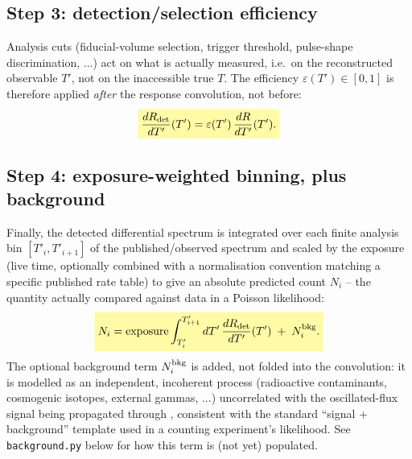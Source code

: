\begin{theorybox}
\subsection*{Step 3: detection/selection efficiency}
Analysis cuts (fiducial-volume selection, trigger threshold,
pulse-shape discrimination, ...) act on what is actually measured, i.e.\ on
the reconstructed observable $T'$, not on the inaccessible true $T$. The
efficiency $\varepsilon(T')\in[0,1]$ is therefore applied \emph{after} the
response convolution, not before:
\begin{equation}
  \keyresult{\frac{dR_{\rm det}}{dT'}(T') = \varepsilon(T')\,\frac{dR}{dT'}(T').}
  \label{eq:detector-efficiency}
\end{equation}

\subsection*{Step 4: exposure-weighted binning, plus background}
Finally, the detected differential spectrum is integrated over each finite
analysis bin $[T'_i,T'_{i+1}]$ of the published/observed spectrum and scaled
by the exposure (live time, optionally combined with a normalisation
convention matching a specific published rate table) to give an absolute
predicted count $N_i$ -- the quantity actually compared against data in a
Poisson likelihood:
\begin{equation}
  \keyresult{N_i = {\rm exposure}\int_{T'_i}^{T'_{i+1}} dT'\,
    \frac{dR_{\rm det}}{dT'}(T') \;+\; N_i^{\rm bkg}.}
  \label{eq:detector-bin-counts}
\end{equation}
The optional background term $N_i^{\rm bkg}$ is added, not folded into the
convolution: it is modelled as an independent, incoherent process (radioactive
contaminants, cosmogenic isotopes, external gammas, ...) uncorrelated with
the oscillated-flux signal being propagated through
,
consistent with the standard ``signal + background'' template used in a
counting experiment's likelihood. See \texttt{background.py} below for how
this term is (not yet) populated.
\end{theorybox}

